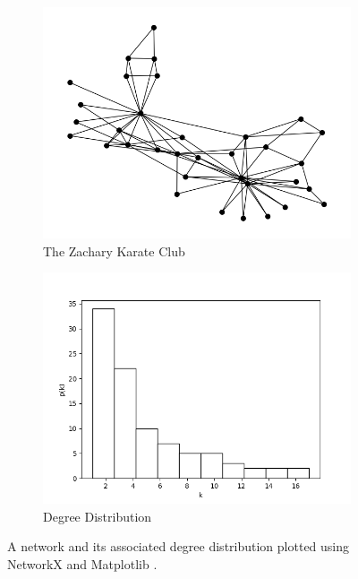 \begin{figure}
    \begin{center}
        \begin{subfigure}[b]{0.45\textwidth}
            \includegraphics[width=\textwidth]{img/zachary_spring}
            \caption{The Zachary Karate Club}
            \label{fig:zachary_karate_club_degree}
        \end{subfigure}
        \begin{subfigure}[b]{0.45\textwidth}
            \includegraphics[width=\textwidth]{img/2/zachary_degree_hist}
            \caption{Degree Distribution}
            \label{fig:zachary_degree_distribution}
        \end{subfigure}
    \end{center}
    \caption{A network and its associated degree distribution plotted using NetworkX \cite{SciPyProceedings_11} and Matplotlib \cite{Hunter:2007}.}
    \label{fig:zachary_degree_diagram}
\end{figure}


